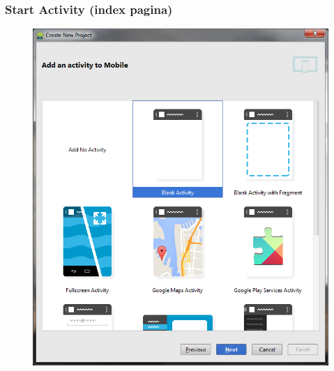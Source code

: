 \documentclass[11pt]{beamer}
\begin{document}
\begin{frame}
\frametitle{Start Activity (index pagina)}
\begin{figure}
\centering
\includegraphics[height=.9\textheight]{./newactivity}
\label{fig:newactivity1}
\end{figure}
\end{frame}
\end{document}
